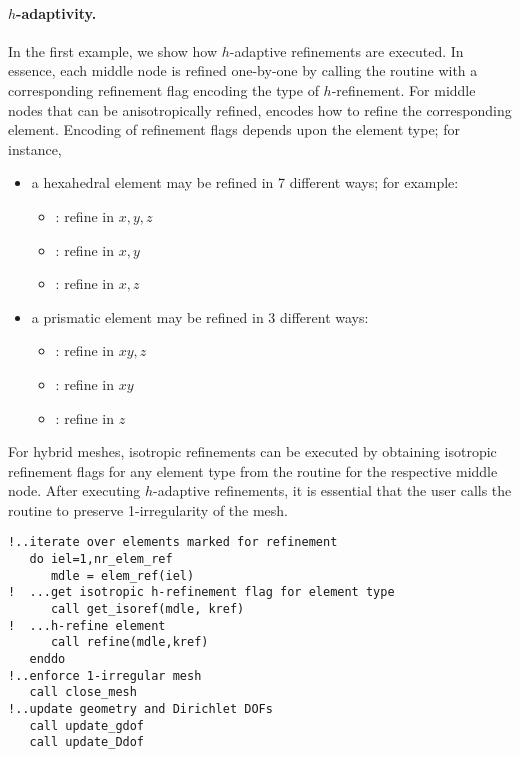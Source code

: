 \paragraph{$h$-adaptivity.}
In the first example, we show how $h$-adaptive refinements are executed. In essence, each middle node is refined one-by-one by calling the  routine with a corresponding refinement flag  encoding the type of $h$-refinement. For middle nodes that can be anisotropically refined,  encodes how to refine the corresponding element. Encoding of refinement flags depends upon the element type; for instance,
\begin{itemize}
	\item a hexahedral element may be refined in 7 different ways; for example:
	\begin{itemize}
		\itemsep 0pt
		\item {} : refine in $x,y,z$
		\item {} : refine in $x,y$
		\item {} : refine in $x,z$
	\end{itemize}
	\item a prismatic element may be refined in 3 different ways:
	\begin{itemize}
		\itemsep 0pt
		\item {} : refine in $xy,z$
		\item {} : refine in $xy$
		\item {} : refine in $z$
	\end{itemize}
\end{itemize}

For hybrid meshes, isotropic refinements can be executed by obtaining isotropic refinement flags for any element type from the routine  for the respective middle node. After executing $h$-adaptive refinements, it is essential that the user calls the  routine to preserve 1-irregularity of the mesh.

\begin{lstlisting}[caption=Isotropic $h$-adaptive refinements., label={lst:adaptive_refinement_element_loop4}]
!..iterate over elements marked for refinement
   do iel=1,nr_elem_ref
      mdle = elem_ref(iel)
!  ...get isotropic h-refinement flag for element type
      call get_isoref(mdle, kref)
!  ...h-refine element
      call refine(mdle,kref)
   enddo
!..enforce 1-irregular mesh
   call close_mesh
!..update geometry and Dirichlet DOFs
   call update_gdof
   call update_Ddof
\end{lstlisting}

